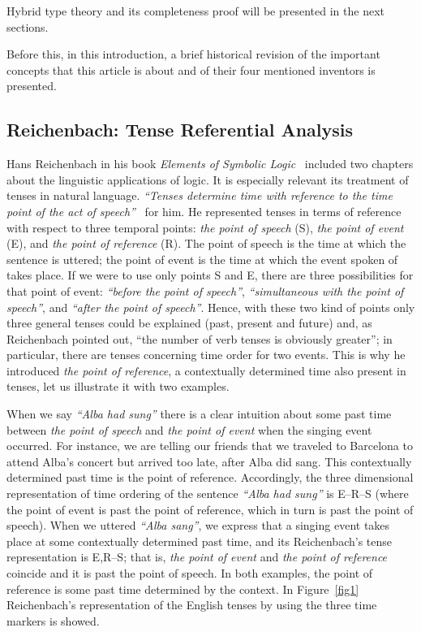 Hybrid type theory and its completeness proof will be presented in the next
sections.

Before this, in this introduction, a brief historical revision of the
important concepts that this article is about and of their four mentioned
inventors is presented.

\subsection{Reichenbach: Tense Referential Analysis}

Hans Reichenbach in his book \emph{Elements of Symbolic 
Logic}~\cite{Reichenbach1947} included two chapters about the linguistic applications
of logic. It is especially relevant its treatment of tenses in natural
language. \emph{``Tenses determine time with reference to
the time point of the act of 
speech''}~\cite{Reichenbach1947} for him. He represented tenses in terms of reference with respect to
three temporal points: \emph{the point of speech} (S), \emph{the point
of event} (E), and \emph{the point of reference} (R). The point of speech
is the time at which the sentence is uttered; the point of event is the time
at which the event spoken of takes place. If we were to use only points S
and E, there are three possibilities for that point of event:
\emph{``before the point of speech''},
\emph{``simultaneous with the point of speech''}, 
and \emph{``after the point of speech''}. Hence, with these two kind of points only three
general tenses could be explained (past, present and future) and, as
Reichenbach pointed out, ``the number of verb tenses is
obviously greater''; in particular, there are tenses
concerning time order for two events. This is why he introduced \emph{the
point of reference}, a contextually determined time also present in tenses,
let us illustrate it with two examples.

When we say \emph{``Alba had sung''} there
is a clear intuition about some past time between 
\emph{the point of speech} and \emph{the point of event} when the singing event occurred. For
instance, we are telling our friends that we traveled to Barcelona to
attend Alba's concert but arrived too late, after Alba did sang. This
contextually determined past time is the point of reference. Accordingly,
the three dimensional representation of time ordering of the sentence 
\emph{``Alba had sung''} is E--R--S (where the
point of event is past the point of reference, which in turn is past the
point of speech). When we uttered \emph{``Alba
sang''}, we express that a singing event takes place at
some contextually determined past time, and its Reichenbach's tense
representation is E,R--S; that is, \emph{the point of event} and 
\emph{the point of reference} coincide and it is past the point of speech. In both
examples, the point of reference is some past time determined by the
context. In Figure~\ref{fig1} Reichenbach's representation of the English tenses by
using the three time markers is showed.

